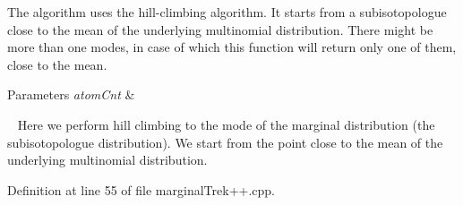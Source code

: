 The algorithm uses the hill-\/climbing algorithm. It starts from a subisotopologue close to the mean of the underlying multinomial distribution. There might be more than one modes, in case of which this function will return only one of them, close to the mean.


\begin{DoxyParams}{Parameters}
{\em atom\+Cnt} & \\
\hline
\end{DoxyParams}
~\newline
Here we perform hill climbing to the mode of the marginal distribution (the subisotopologue distribution). We start from the point close to the mean of the underlying multinomial distribution.

Definition at line 55 of file marginal\+Trek++.\+cpp.

